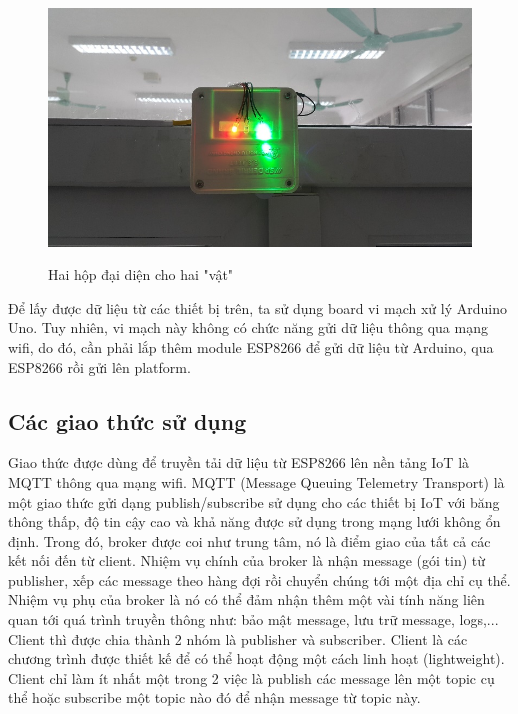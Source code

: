 \begin{figure}
	\center
	\includegraphics[scale=1]{image/hop_2}
	\label{fig:2hop}
	\caption{Hai hộp đại diện cho hai "vật"}
\end{figure}

Để lấy được dữ liệu từ các thiết bị trên, ta sử dụng board vi mạch xử lý Arduino Uno. Tuy nhiên, vi mạch này không có chức năng gửi dữ liệu thông qua mạng wifi, do đó, cần phải lắp thêm module ESP8266 để gửi dữ liệu từ Arduino, qua ESP8266 rồi gửi lên platform.

\subsection{Các giao thức sử dụng}
Giao thức được dùng để truyền tải dữ liệu từ ESP8266 lên nền tảng IoT là MQTT thông qua mạng wifi. MQTT (Message Queuing Telemetry Transport) là một giao thức gửi dạng publish/subscribe sử dụng cho các thiết bị IoT với băng thông thấp, độ tin cậy cao và khả năng được sử dụng trong mạng lưới không ổn định. Trong đó, broker được coi như trung tâm, nó là điểm giao của tất cả các kết nối đến từ client. Nhiệm vụ chính của broker là nhận message (gói tin) từ publisher, xếp các message theo hàng đợi rồi chuyển chúng tới một địa chỉ cụ thể. Nhiệm vụ phụ của broker là nó có thể đảm nhận thêm một vài tính năng liên quan tới quá trình truyền thông như: bảo mật message, lưu trữ message, logs,...
Client thì được chia thành 2 nhóm là publisher và subscriber. Client là các chương trình được thiết kế để có thể hoạt động một cách linh hoạt (lightweight). Client chỉ làm ít nhất một trong 2 việc là publish các message lên một topic cụ thể hoặc subscribe một topic nào đó để nhận message từ topic này.

